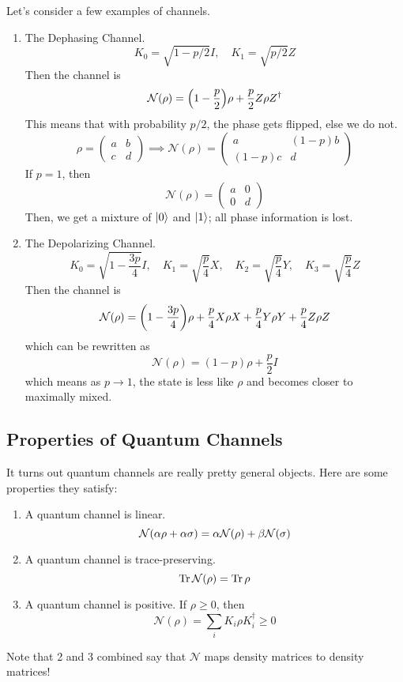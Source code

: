 Let's consider a few examples of channels.
\begin{example}
    \begin{enumerate}
        \item The Dephasing Channel.
        \[ K_0 = \sqrt{1 - p/2} I, \quad K_1 = \sqrt{p/2} Z \]
        Then the channel is \[\mathcal{N}(\rho) = \qty(1 - \frac{p}{2}) \rho + \frac{p}{2} Z \rho Z^{\dagger}\]
        This means that with probability $p/2$, the phase gets flipped, else we do not.
        \[ \rho = \begin{pmatrix}
            a & b \\ c & d
        \end{pmatrix} \implies \mathcal{N}(\rho) = \begin{pmatrix}
            a & (1 - p) b \\ (1 - p) c & d
        \end{pmatrix} \]
        If $p = 1$, then 
        \[ \mathcal{N}(\rho) = \begin{pmatrix}
            a & 0 \\ 0 & d
        \end{pmatrix} \]
        Then, we get a mixture of $\ket{0}$ and $\ket{1}$; all phase information is lost.
        \item The Depolarizing Channel.
        \[ K_0 = \sqrt{1 - \frac{3p}{4}} I, \quad K_1 = \sqrt{\frac{p}{4}} X, \quad K_2 = \sqrt{\frac{p}{4}} Y,\quad K_3 = \sqrt{\frac{p}{4}} Z \]
        Then the channel is 
        \[ \mathcal{N}(\rho) = \qty(1 - \frac{3p}{4}) \rho + \frac{p}{4} X \rho X + \frac{p}{4} Y \rho Y + \frac{p}{4} Z \rho Z\]
        which can be rewritten as
        \[ \mathcal{N}(\rho) = (1 - p) \rho + \frac{p}{2} I  \]
        which means as $p \to 1$, the state is less like $\rho$ and becomes closer to maximally mixed.
    \end{enumerate}
\end{example}

\subsection{Properties of Quantum Channels}

It turns out quantum channels are really pretty general objects. Here are some properties they satisfy:
\begin{enumerate}
    \item A quantum channel is linear.
    \[ \mathcal{N}\qty(\alpha \rho + \alpha \sigma) = \alpha \mathcal{N}(\rho) + \beta \mathcal{N}(\sigma) \]
    \item A quantum channel is trace-preserving.
    \[ \Tr \mathcal{N}(\rho) = \Tr \rho \]
    \item A quantum channel is positive. If $\rho \geq 0$, then
    \[ \mathcal{N}(\rho) = \sum_i K_i \rho K_i^{\dagger} \geq 0 \]
\end{enumerate}
Note that 2 and 3 combined say that $\mathcal{N}$ maps density matrices to density matrices! 

